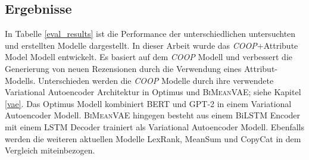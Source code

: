 


\subsection{Ergebnisse}
\label{eval_results_chapter}
In Tabelle \ref{eval_results} ist die Performance der unterschiedlichen untersuchten und erstellten Modelle dargestellt.
In dieser Arbeit wurde das \glqq \textit{COOP}+Attribute Model\grqq{} Modell entwickelt.
Es basiert auf dem \textit{COOP} Modell und verbessert die Generierung von neuen Rezensionen durch die Verwendung eines Attribut-Modells.
Unterschieden werden die \textit{COOP} Modelle durch ihre verwendete Variational Autoencoder Architektur in Optimus und \textsc{BiMeanVAE}; siehe Kapitel \ref{vae}.
Das Optimus Modell kombiniert BERT und GPT-2 in einem Variational Autoencoder Modell. \textsc{BiMeanVAE} hingegen besteht aus einem BiLSTM Encoder mit einem LSTM Decoder trainiert als Variational Autoencoder Modell.
Ebenfalls werden die weiteren aktuellen Modelle LexRank, MeanSum und CopyCat in dem Vergleich miteinbezogen.

